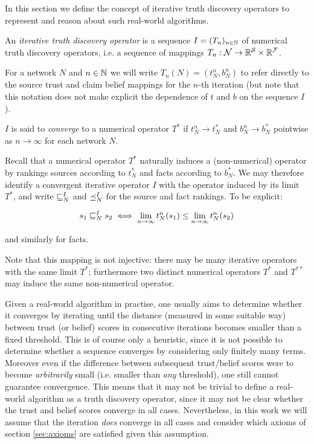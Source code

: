 \documentclass[../main.tex]{subfiles}
\begin{document}
In this section we define the concept of iterative truth discovery operators to
represent and reason about such real-world algorithms.

\begin{definition}
\label{def:iterative_operator}

An \emph{iterative truth discovery operator} is a sequence $I=(T_n)_{n \in
\mathbb{N}}$ of numerical truth discovery operators, i.e. a sequence of mappings $T_n
: \mathcal{N} \rightarrow \mathbb{R}^{\mathcal{S}} \times \mathbb{R}^{\mathcal{F}}$.

For a network $N$ and $n \in \mathbb{N}$ we will write $T_n(N) = (t_N^n, b_N^n)$ to
refer directly to the source trust and claim belief mappings for the $n$-th
iteration (but note that this notation does not make explicit the dependence of
$t$ and $b$ on the sequence $I$).

$I$ is said to \emph{converge} to a numerical operator $T^*$ if $t_N^n
\rightarrow t_N^*$ and $b_N^n \rightarrow b_N^*$ pointwise as $n \rightarrow
\infty$ for each network $N$.

\end{definition}

\begin{remark}
Recall that a numerical operator $T^*$ naturally induces a (non-numerical)
operator by rankings sources according to $t_N^*$ and facts according to
$b_N^*$. We may therefore identify a convergent iterative operator $I$ with the
operator induced by its limit $T^*$, and write $\sqsubseteq_N^I$ and $\preceq_N^I$ for
the source and fact rankings. To be explicit:

$$ s_1 \sqsubseteq_N^I s_2 \iff \lim_{n \rightarrow \infty}{t_N^n(s_1)} \le \lim_{n
\rightarrow \infty}{t_N^n(s_2)} $$

and similarly for facts.

Note that this mapping is not injective: there may be many iterative operators
with the same limit $T^*$; furthermore two distinct numerical operators $T^*$
and $T^{**}$ may induce the same non-numerical operator.
\end{remark}

Given a real-world algorithm in practise, one usually aims to determine whether
it converges by iterating until the distance (measured in some suitable way)
between trust (or belief) scores in consecutive iterations becomes smaller than
a fixed threshold. This is of course only a heuristic, since it is not possible
to determine whether a sequence converges by considering only finitely many
terms. Moreover even if the difference between subsequent trust/belief scores
were to become \emph{arbitrarily} small (i.e. smaller than \emph{any}
threshold), one still cannot guarantee convergence\footnotemark. This means
that it may not be trivial to define a real-world algorithm as a truth
discovery operator, since it may not be clear whether the trust and belief
scores converge in all cases. Nevertheless, in this work we will assume that
the iteration \emph{does} converge in all cases and consider which axioms of
section \ref{sec:axioms} are satisfied given this assumption.
\end{document}
